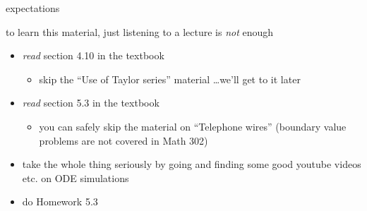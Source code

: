 \documentclass[dvipsnames,colorlinks]{beamer}
\begin{document}
\begin{frame}{expectations}

to learn this material, just listening to a lecture is \emph{not} enough
     \begin{itemize}
     \item \emph{read} section 4.10 in the textbook
         \begin{itemize}
         \item skip the ``Use of Taylor series'' material \dots we'll get to it later
         \end{itemize}
     \item \emph{read} section 5.3 in the textbook
         \begin{itemize}
         \item you can safely skip the material on ``Telephone wires'' (boundary value problems are not covered in Math 302)
         \end{itemize}
     \item take the whole thing seriously by going and finding some good youtube videos etc. on ODE simulations
     \item do Homework 5.3
     \end{itemize}
\end{frame}
\end{document}
